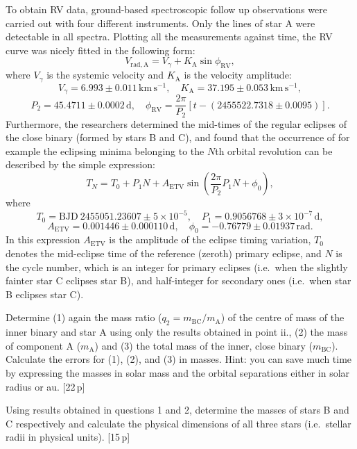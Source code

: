 \begin{description}
  To obtain RV data, ground-based spectroscopic follow up observations were
  carried out with four different instruments. Only the lines of star A were
  detectable in all spectra. Plotting all the measurements against time, the
  RV curve was nicely fitted in the following form:
  \[ V_{\mathrm{rad,A}} = V_\gamma + K_{\mathrm{A}}\sin\phi_{\mathrm{RV}}, \]
  where $V_\gamma$ is the systemic velocity and $K_{\mathrm{A}}$ is the
  velocity amplitude:
  \[ V_\gamma = 6.993 \pm 0.011\,\mathrm{km\,s^{-1}}, \quad
     K_{\mathrm{A}} = 37.195 \pm 0.053\,\mathrm{km\,s^{-1}}, \]
  \[ P_2 = 45.4711 \pm 0.0002\,\mathrm{d}, \quad
     \phi_{\mathrm{RV}} = \frac{2\pi}{P_2}
     \left[t - (2455522.7318 \pm 0.0095)\right]. \]
  Furthermore, the researchers determined the mid-times of the regular
  eclipses of the close binary (formed by stars B and C), and found that the
  occurrence of for example the eclipsing minima belonging to the $N$th
  orbital revolution can be described by the simple expression:
  \[ T_N = T_0 + P_1 N + A_{\mathrm{ETV}}
     \sin\left(\frac{2\pi}{P_2}P_1 N + \phi_0\right), \]
  where
  \[ T_0 = \mathrm{BJD}\ 2455051.23607 \pm 5\times10^{-5}, \quad
     P_1 = 0.9056768 \pm 3\times10^{-7}\,\mathrm{d}, \]
  \[ A_{\mathrm{ETV}} = 0.001446 \pm 0.000110\,\mathrm{d}, \quad
     \phi_0 = -0.76779 \pm 0.01937\,\mathrm{rad}. \]
  In this expression $A_{\mathrm{ETV}}$ is the amplitude of the eclipse
  timing variation, $T_0$ denotes the mid-eclipse time of the reference
  (zeroth) primary eclipse, and $N$ is the cycle number, which is an integer
  for primary eclipses (i.e.\ when the slightly fainter star C eclipses star
  B), and half-integer for secondary ones (i.e.\ when star B eclipses star
  C).

  Determine (1) again the mass ratio
  ($q_2 = m_{\mathrm{BC}}/m_{\mathrm{A}}$) of the centre of mass of the
  inner binary and star A using only the results obtained in point ii., (2)
  the mass of component A ($m_{\mathrm{A}}$) and (3) the total mass of the
  inner, close binary ($m_{\mathrm{BC}}$). Calculate the errors for (1),
  (2), and (3) in masses. Hint: you can save much time by expressing the
  masses in solar mass and the orbital separations either in solar radius or
  au. \hfill[22\,p]

\item[iii.] Using results obtained in questions 1 and 2, determine the
  masses of stars B and C respectively and calculate the physical dimensions
  of all three stars (i.e.\ stellar radii in physical units). \hfill[15\,p]
\end{description}

